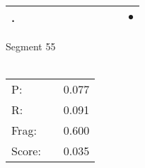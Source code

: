 \documentclass[landscape]{article}
\newcommand{\ssp}{\hspace{2pt}}
\newcommand{\mex}{\cellcolor{g}$\bullet$}
\begin{document}
\begin{tabular}{|l|p{10pt}|p{10pt}|p{10pt}|p{10pt}|p{10pt}|p{10pt}|p{10pt}|p{10pt}|p{10pt}|p{10pt}|}
\hline
\ssp \cellcolor{ref9}. \ssp&\hspace{2pt}&\hspace{2pt}&\hspace{2pt}&\hspace{2pt}&\hspace{2pt}&\hspace{2pt}&\hspace{2pt}&\hspace{2pt}&\hspace{2pt}&\hspace{2pt}\mex\\
\hline
\end{tabular}

\vspace{6pt}
\noindent Segment 55\\\\
\noindent\begin{tabular}{lm{12pt}r}
\hline
P:&&0.077\\
R:&&0.091\\
Frag:&&0.600\\
Score:&&0.035\\
\end{tabular}

\newpage
\end{document}
